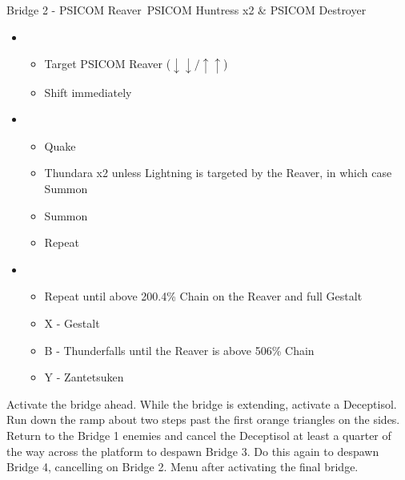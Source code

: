 	\begin{battle}[0:43]{Bridge 2 - PSICOM Reaver\, PSICOM Huntress x2 \& PSICOM Destroyer}%
		\begin{itemize}
			\item \first
			      \begin{itemize}
				      \item Target PSICOM Reaver ($\downarrow\downarrow/\uparrow\uparrow$)
				      \item Shift immediately
			      \end{itemize}
			\item \second
			      \begin{itemize}
				      \item Quake
				      \item Thundara x2 unless Lightning is targeted by the Reaver, in which case Summon
				      \item Summon
				      \item Repeat
			      \end{itemize}
			\item \third
			      \begin{itemize}
				      \item Repeat until above 200.4\% Chain on the Reaver and full Gestalt
				      \item X - Gestalt
				      \item B - Thunderfalls until the Reaver is above 506\% Chain
				      \item Y - Zantetsuken
			      \end{itemize}
		\end{itemize}
		   
	\end{battle}
	Activate the bridge ahead. While the bridge is extending, activate a Deceptisol.  Run down the ramp about two steps past the first orange triangles on the sides. Return to the Bridge 1 enemies and cancel the Deceptisol at least a quarter of the way across the platform to despawn Bridge 3. Do this again to despawn Bridge 4, cancelling on Bridge 2. Menu after activating the final bridge.
